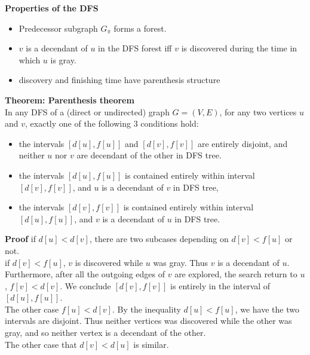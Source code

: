 \documentclass{beamer}
\begin{document}
\begin{frame}{}

{\bf Properties of the DFS} \\
\begin{itemize}
\item Predecessor subgraph $G_{\pi}$ forms a forest. 
\item $v$ is a decendant of $u$ in the DFS forest iff $v$ is discovered
 during the time in which $u$ is gray.  
\item discovery and finishing time have parenthesis structure
\end{itemize}
\end{frame}

\begin{frame}{}

{\bf Theorem: Parenthesis theorem} \\
In any DFS of a (direct or undirected) graph $G=(V,E)$, for any two
vertices $u$ and $v$, exactly one of the following 3 conditions hold:
\begin{itemize}
\item the intervals $[d[u],f[u]]$ and $[d[v],f[v]]$ are entirely disjoint,
 and neither $u$ nor $v$ are decendant of the other in DFS tree. 
\item the intervals $[d[u],f[u]]$ is contained entirely within interval
 $[d[v],f[v]]$, and $u$ is a decendant of $v$ in DFS tree,
\item the intervals $[d[v],f[v]]$ is contained entirely within interval
 $[d[u],f[u]]$, and $v$ is a decendant of $u$ in DFS tree.
\end{itemize}
\end{frame}

\begin{frame}{}

{\bf Proof} if $d[u]<d[v]$, there are two subcases depending on $d[v]<f[u]$
 or not. \\
if $d[v]<f[u]$, $v$ is discovered while $u$ was gray.  Thus $v$ is a decendant 
 of $u$.  Furthermore, after all the outgoing edges of $v$ are explored, the
 search  return to $u$, $f[v]<d[v]$.  We conclude $[d[v],f[v]]$ is
 entirely in the interval of $[d[u],f[u]]$.  
\\ The other case $f[u]<d[v]$. By the inequality $d[u]<f[u]$, we have
 the two intervals are disjoint.  Thus neither vertices was discovered
 while the other was gray, and so neither vertex is a decendant of the
 other.  \\
The other case that $d[v]<d[u]$ is similar.  
\end{frame}
\end{document}

